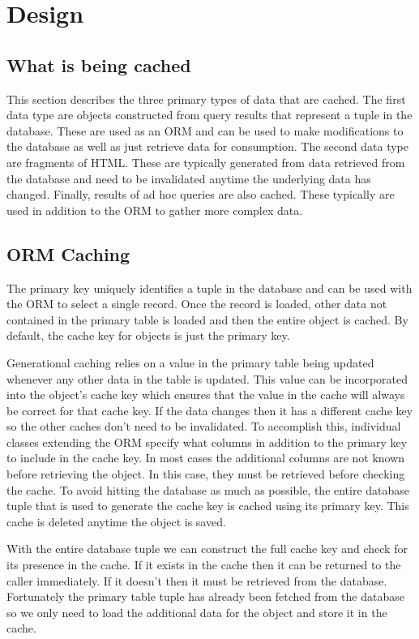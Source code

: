 \documentclass[12pt]{ucthesis}
\begin{document}

\section{Design}
\subsection{What is being cached}
This section describes the three primary types of data that are cached.
The first data type are objects constructed from query results that represent a tuple in the database.
These are used as an ORM and can be used to make modifications to the database as well as just retrieve data for consumption.
The second data type are fragments of HTML.
These are typically generated from data retrieved from the database and need to be invalidated anytime the underlying data has changed.
Finally, results of ad hoc queries are also cached.
These typically are used in addition to the ORM to gather more complex data.

\subsection{ORM Caching}
The primary key uniquely identifies a tuple in the database and can be used with the ORM to select a single record.
Once the record is loaded, other data not contained in the primary table is loaded and then the entire object is cached.
By default, the cache key for objects is just the primary key.

Generational caching relies on a value in the primary table being updated whenever any other data in the table is updated.
This value can be incorporated into the object's cache key which ensures that the value in the cache will always be correct for that cache key.
If the data changes then it has a different cache key so the other caches don't need to be invalidated.
To accomplish this, individual classes extending the ORM specify what columns in addition to the primary key to include in the cache key.
In most cases the additional columns are not known before retrieving the object.
In this case, they must be retrieved before checking the cache.
To avoid hitting the database as much as possible, the entire database tuple that is used to generate the cache key is cached using its primary key.
This cache is deleted anytime the object is saved.

With the entire database tuple we can construct the full cache key and check for its presence in the cache.
If it exists in the cache then it can be returned to the caller immediately.
If it doesn't then it must be retrieved from the database.
Fortunately the primary table tuple has already been fetched from the database so we only need to load the additional data for the object and store it in the cache.
\end{document}
